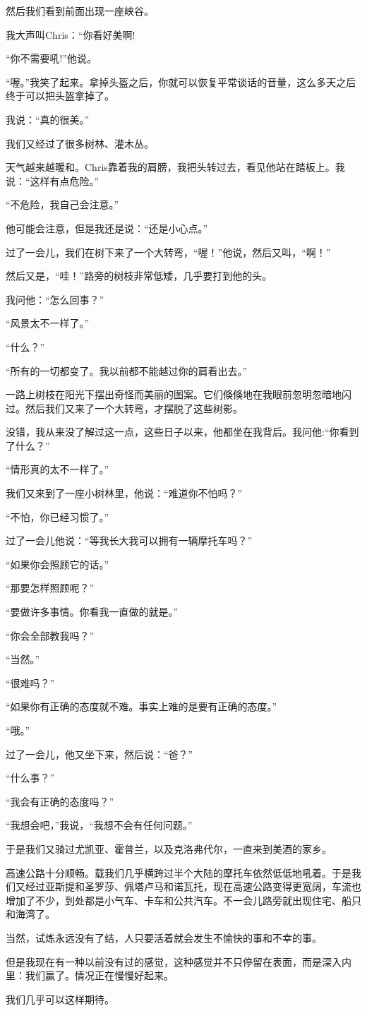 \documentclass[UTF8]{article}
\begin{document}
\par 然后我们看到前面出现一座峡谷。
\par 我大声叫Chris：“你看好美啊!
\par “你不需要吼!”他说。
\par “喔。”我笑了起来。拿掉头盔之后，你就可以恢复平常谈话的音量，这么多天之后终于可以把头盔拿掉了。
\par 我说：“真的很美。”
\par 我们又经过了很多树林、灌木丛。
\par 天气越来越暖和。Chris靠着我的肩膀，我把头转过去，看见他站在踏板上。我说：“这样有点危险。”
\par “不危险，我自己会注意。”
\par 他可能会注意，但是我还是说：“还是小心点。”
\par 过了一会儿，我们在树下来了一个大转弯，“喔！”他说，然后又叫，“啊！”
\par 然后又是，“哇！”路旁的树枝非常低矮，几乎要打到他的头。
\par 我问他：“怎么回事？”
\par “风景太不一样了。”
\par “什么？”
\par “所有的一切都变了。我以前都不能越过你的肩看出去。”
\par 一路上树枝在阳光下摆出奇怪而美丽的图案。它们倏倏地在我眼前忽明忽暗地闪过。然后我们又来了一个大转弯，才摆脱了这些树影。
\par 没错，我从来没了解过这一点，这些日子以来，他都坐在我背后。我问他:“你看到了什么？”
\par “情形真的太不一样了。”
\par 我们又来到了一座小树林里，他说：“难道你不怕吗？”
\par “不怕，你已经习惯了。”
\par 过了一会儿他说：“等我长大我可以拥有一辆摩托车吗？”
\par “如果你会照顾它的话。”
\par “那要怎样照顾呢？”
\par “要做许多事情。你看我一直做的就是。”
\par “你会全部教我吗？”
\par “当然。”
\par “很难吗？”
\par “如果你有正确的态度就不难。事实上难的是要有正确的态度。”
\par “哦。”
\par 过了一会儿，他又坐下来，然后说：“爸？”
\par “什么事？”
\par “我会有正确的态度吗？”
\par “我想会吧，”我说，“我想不会有任何问题。”
\par 于是我们又骑过尤凯亚、霍普兰，以及克洛弗代尔，一直来到美酒的家乡。
\par 高速公路十分顺畅。载我们几乎横跨过半个大陆的摩托车依然低低地吼着。于是我们又经过亚斯提和圣罗莎、佩塔卢马和诺瓦托，现在高速公路变得更宽阔，车流也增加了不少，到处都是小气车、卡车和公共汽车。不一会儿路旁就出现住宅、船只和海湾了。
\par 当然，试炼永远没有了结，人只要活着就会发生不愉快的事和不幸的事。
\par 但是我现在有一种以前没有过的感觉，这种感觉并不只停留在表面，而是深入内里：我们赢了。情况正在慢慢好起来。
\par 我们几乎可以这样期待。
\end{document}
